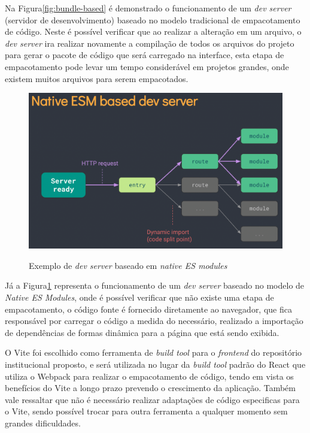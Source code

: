 Na Figura\ref{fig:bundle-based} é demonstrado o funcionamento de um \emph{dev server}
(servidor de desenvolvimento) baseado no modelo tradicional de empacotamento de código.
Neste é possível verificar que ao realizar a alteração em um arquivo, o \emph{dev server}
ira realizar novamente a compilação de todos os arquivos do projeto para gerar o pacote
de código que será carregado na interface, esta etapa de empacotamento pode levar um tempo
considerável em projetos grandes, onde existem muitos arquivos para serem empacotados.

\begin{figure}[htb]
    \caption{Exemplo de \emph{dev server} baseado em \emph{native ES modules}}
    \centering
    \includegraphics[scale=0.4]{img/esm-based.png}
    \label{fig:esm-based}
\end{figure}

Já a Figura\ref{fig:esm-based} representa o funcionamento de um \emph{dev server}
baseado no modelo de \emph{Native ES Modules}, onde é possível verificar que
não existe uma etapa de empacotamento, o código fonte é fornecido diretamente
ao navegador, que fica responsável por carregar o código a medida do necessário,
realizado a importação de dependências de formas dinâmica para a página que está
sendo exibida.

O Vite foi escolhido como ferramenta de \emph{build tool} para o \emph{frontend}
do repositório institucional proposto, e será utilizada no lugar da \emph{build tool}
padrão do React que utiliza o Webpack para realizar o empacotamento de código,
tendo em vista os benefícios do Vite a longo prazo prevendo o crescimento da aplicação.
Também vale ressaltar que não é necessário realizar adaptações de código especificas
para o Vite, sendo possível trocar para outra ferramenta a qualquer momento sem
grandes dificuldades.

